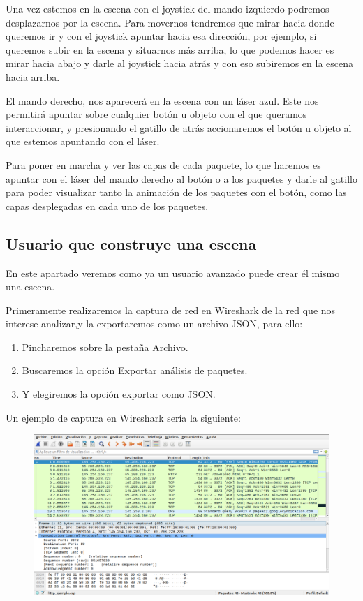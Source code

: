\documentclass[a4paper, 12pt]{book}
\begin{document}
\begin{itemize}
Una vez estemos en la escena con el joystick del mando izquierdo podremos desplazarnos por la escena. Para movernos tendremos que mirar hacia donde queremos ir y con el joystick apuntar hacia esa dirección, por ejemplo, si queremos subir en la escena y situarnos más arriba, lo que podemos hacer es mirar hacia abajo y darle al joystick hacia atrás y con eso subiremos en la escena hacia arriba.

El mando derecho, nos aparecerá en la escena con un láser azul. Este nos permitirá apuntar sobre cualquier botón u objeto con el que queramos interaccionar, y presionando el gatillo de atrás accionaremos el botón u objeto al que estemos apuntando con el láser.

Para poner en marcha y ver las capas de cada paquete, lo que haremos es apuntar con el láser del mando derecho al botón o a los paquetes y darle al gatillo para poder visualizar tanto la animación de los paquetes con el botón, como las capas desplegadas en cada uno de los paquetes.

\end{itemize}
\subsection{Usuario que construye una escena}

En este apartado veremos como ya un usuario avanzado puede  crear él mismo una escena.

Primeramente realizaremos la captura de red en Wireshark de la red que nos interese analizar,y la exportaremos como un archivo JSON, para ello:
\begin{enumerate}
    \item Pincharemos sobre la pestaña Archivo.
    \item Buscaremos la opción Exportar análisis de paquetes.
    \item Y elegiremos la opción exportar como JSON.
\end{enumerate}

Un ejemplo de captura en Wireshark sería la siguiente:
\begin{figure}[h]
\centering
    \includegraphics[scale=0.3]{img/cap_wireshark.png}
\end{figure}
\end{document}
